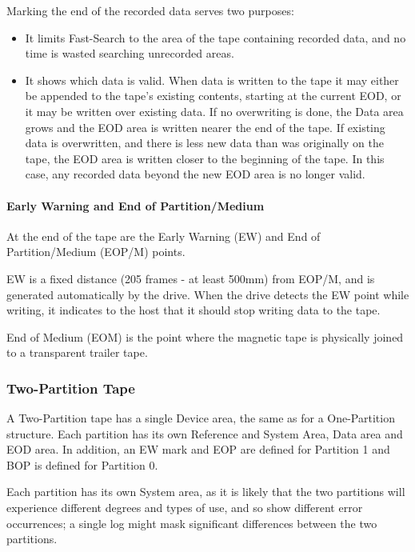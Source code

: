 \documentclass[11pt]{article}
\begin{document}
Marking the end of the recorded data serves two purposes:

\begin {itemize}

\item It limits Fast-Search to the area of the tape containing recorded
data, and no time is wasted searching unrecorded areas.

\item It shows which data is valid. When data is written to the tape it may
either be appended to the tape's existing contents, starting at the current
EOD, or it may be written over existing data. If no overwriting is done, the
Data area grows and the EOD area is written nearer the end of the tape. If
existing data is overwritten, and there is less new data than was originally
on the tape, the EOD area is written closer to the beginning of the tape. In
this case, any recorded data beyond the new EOD area is no longer valid.

\end {itemize}

\paragraph {Early Warning and End of Partition/Medium}

At the end of the tape are the Early Warning (EW) and End of
Partition/Medium (EOP/M) points.

EW is a fixed distance (205 frames - at least 500mm) from EOP/M, and is
generated automatically by the drive. When the drive detects the EW point while
writing, it indicates to the host that it should stop writing data to the tape.

End of Medium (EOM) is the point where the magnetic tape is physically joined
to a transparent trailer tape.

\subsubsection {Two-Partition Tape}

A Two-Partition tape has a single Device area, the same as for a
One-Partition structure. Each partition has its own Reference and System
Area, Data area and EOD area. In addition, an EW mark and EOP are defined for
Partition 1 and BOP is defined for Partition 0.

Each partition has its own System area, as it is likely that the two
partitions will experience different degrees and types of use, and so show
different error occurrences; a single log might mask significant differences
between the two partitions.
\end{document}

